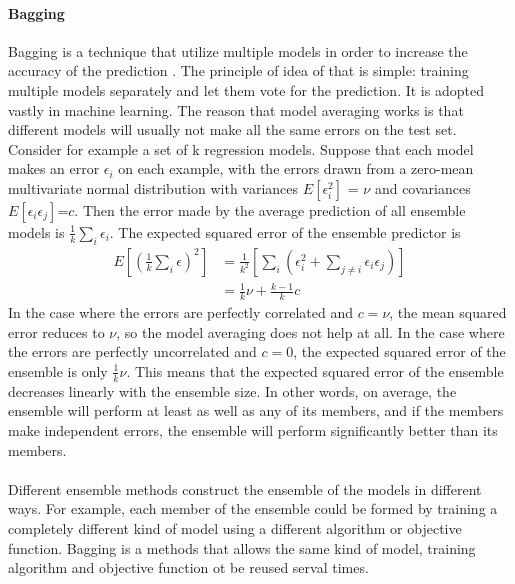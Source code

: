 \paragraph{Bagging}
Bagging is a technique that utilize multiple models in order to increase the accuracy of the prediction \cite{Breiman1996}.
The principle of idea of that is simple: training multiple models separately and let them vote for the prediction.
It is adopted vastly in machine learning.
The reason that model averaging works is that different models will usually not make all the same errors on the test set.
Consider for example a set of k regression models.
Suppose that each model makes an error $\epsilon_i$ on each example, with the errors drawn from a zero-mean multivariate normal distribution with variances $E[\epsilon_i^2]$ = $\nu$ and covariances $E[\epsilon_i \epsilon_j]$=$c$.
Then the error made by the average prediction of all ensemble models is $\frac{1}{k}\sum_i \epsilon_i$.
The expected squared error of the ensemble predictor is 
\begin{equation}
    \begin{aligned}
    E[(\frac{1}{k} \sum_i \epsilon)^2] &=
    \frac{1}{k^2}[
        \sum_i (
            \epsilon_i^2 + \sum_{j\neq i}\epsilon_i \epsilon_j
        )
    ] \\
    &= \frac{1}{k}\nu + \frac{k-1}{k}c
    \end{aligned}
\end{equation}
In the case where the errors are perfectly correlated and $c=\nu$, the mean squared error reduces to $\nu$, so the model averaging does not help at all.
In the case where the errors are perfectly uncorrelated and $c=0$, the expected squared error of the ensemble is only $\frac{1}{k}\nu$.
This means that the expected squared error of the ensemble decreases linearly with the ensemble size.
In other words, on average, the ensemble will perform at least as well as any of its members, and if the members make independent errors, the ensemble will perform significantly better than its members.
\paragraph{}
Different ensemble methods construct the ensemble of the models in different ways.
For example, each member of the ensemble could be formed by training a completely different kind of model using a different algorithm or objective function.
Bagging is a methods that allows the same kind of model, training algorithm and objective function ot be reused serval times.
